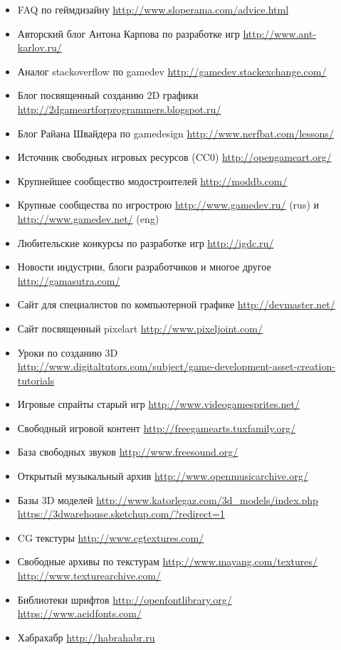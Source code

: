 \begin{itemize}\itemsep-5pt
    \item FAQ по геймдизайну \url{http://www.sloperama.com/advice.html}
    \item Авторский блог Антона Карпова по разработке игр \url{http://www.ant-karlov.ru/}
    \item Аналог stackoverflow по gamedev \url{http://gamedev.stackexchange.com/}
    \item Блог посвященный созданию 2D графики \url{http://2dgameartforprogrammers.blogspot.ru/}
    \item Блог Райана Швайдера по gamedesign \url{http://www.nerfbat.com/lessons/}
    \item Источник свободных игровых ресурсов (CC0) \url{http://opengameart.org/}
    \item Крупнейшее сообщество модостроителей \url{http://moddb.com/}
    \item Крупные сообщества по игрострою \url{http://www.gamedev.ru/} (rus) и \url{http://www.gamedev.net/} (eng)
    \item Любительские конкурсы по разработке игр \url{http://igdc.ru/}
    \item Новости индустрии, блоги разработчиков и многое другое \url{http://gamasutra.com/}
    \item Сайт для специалистов по компьютерной графике \url{http://devmaster.net/}
    \item Сайт посвященный pixelart \url{http://www.pixeljoint.com/}
    \item Уроки по созданию 3D \\
        \url{http://www.digitaltutors.com/subject/game-development-asset-creation-tutorials}
    \item Игровые спрайты старый игр \url{http://www.videogamesprites.net/}
    \item Свободный игровой контент \url{http://freegamearts.tuxfamily.org/}
    \item База свободных звуков \url{http://www.freesound.org/}
    \item Открытый музыкальный архив \url{http://www.openmusicarchive.org/}
    \item Базы 3D моделей \url{http://www.katorlegaz.com/3d_models/index.php}\\
        \url{https://3dwarehouse.sketchup.com/?redirect=1}
    \item CG текстуры \url{http://www.cgtextures.com/}
    \item Свободные архивы по текстурам \url{http://www.mayang.com/textures/}\\
        \url{http://www.texturearchive.com/}
    \item Библиотеки шрифтов \url{http://openfontlibrary.org/}\\
        \url{https://www.acidfonts.com/}
    \item Хабрахабр \url{http://habrahabr.ru}
\end{itemize}

